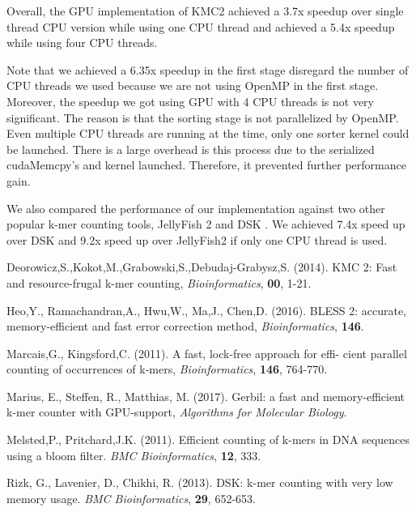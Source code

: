 \documentclass{bioinfo}
\begin{document}
Overall, the GPU implementation of KMC2 achieved a 3.7x speedup over single thread CPU version while using one CPU thread and achieved a 5.4x speedup while using four CPU threads.

Note that we achieved a 6.35x speedup in the first stage disregard the number of CPU threads we used because we are not using OpenMP in the first stage. 
Moreover, the speedup we got using GPU with 4 CPU threads is not very significant.
The reason is that the sorting stage is not parallelized by OpenMP. Even multiple CPU threads are running at the time, only one sorter kernel could be launched. 
There is a large overhead is this process due to the serialized cudaMemcpy's and kernel launched. Therefore, it prevented further performance gain.

We also compared the performance of our implementation against two other popular k-mer counting tools, JellyFish 2 and DSK \citep{Rizk13}. 
We achieved 7.4x speed up over DSK and 9.2x speed up over JellyFish2 if only one CPU thread is used.

\begin{thebibliography}{}

Deorowicz,S.,Kokot,M.,Grabowski,S.,Debudaj-Grabysz,S. (2014). KMC 2: Fast and resource-frugal k-mer counting, {\it Bioinformatics}, {\bf 00}, 1-21.

Heo,Y., Ramachandran,A., Hwu,W., Ma,J., Chen,D. (2016). BLESS 2: accurate, memory-efficient and fast error correction method, {\it Bioinformatics}, {\bf 146}.

Marcais,G., Kingsford,C. (2011).  A fast, lock-free approach for effi-
cient parallel counting of occurrences of k-mers, {\it Bioinformatics}, {\bf 146}, 764-770.

Marius, E., Steffen, R., Matthias, M. (2017). Gerbil: a fast and memory-efficient k-mer counter with GPU-support, {\it Algorithms for Molecular Biology}.

Melsted,P., Pritchard,J.K. (2011). Efficient counting of k-mers in DNA sequences
using a bloom filter. {\it BMC Bioinformatics}, {\bf 12}, 333.

Rizk, G., Lavenier, D., Chikhi, R. (2013). DSK: k-mer counting with very low memory usage. {\it BMC Bioinformatics}, {\bf 29}, 652-653.
\end{thebibliography}
\end{document}
